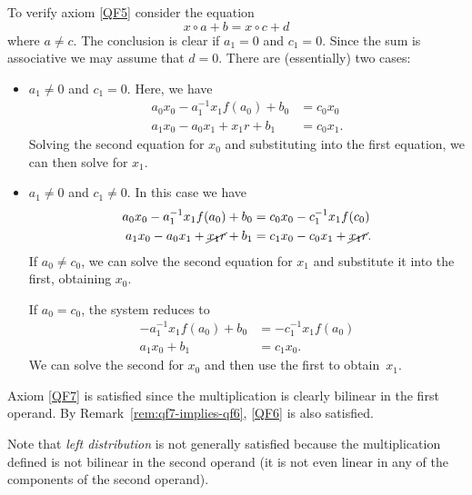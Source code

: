 \begin{xmpl}
    To verify axiom \textsc{\ref{QF5}} consider the equation
    \[
        x\circ a+ b=x\circ c+d
    \]
    where $a\ne c$. The conclusion is clear if $a_1=0$ and $c_1=0$. Since the sum is associative we may assume that $d=0$. There are (essentially) two cases:
    \begin{itemize}
        \item $a_1\ne0$ and $c_1=0$. Here, we have
        \begin{align*}
            a_0x_0-a_1^{-1}x_1f(a_0)+b_0 &= c_0x_0\\
            a_1x_0-a_0x_1+x_1r+b_1 &= c_0x_1.
        \end{align*}
        Solving the second equation for $x_0$ and substituting into the first equation, we can then solve for $x_1$.
        \item $a_1\ne0$ and $c_1\ne0$. In this case we have
        \begin{align*}
            a_0x_0-a_1^{-1}x_1f(a_0)+b_0
                &= c_0x_0-c_1^{-1}x_1f(c_0)\\
            a_1x_0-a_0x_1+\cancel{x_1r}+b_1
                &= c_1x_0-c_0x_1+\cancel{x_1r}.
        \end{align*}
        If $a_0\ne c_0$, we can solve the second equation for $x_1$ and substitute it into the first, obtaining $x_0$.

        If $a_0=c_0$, the system reduces to
        \begin{align*}
            -a_1^{-1}x_1f(a_0)+b_0 &= -c_1^{-1}x_1f(a_0)\\
            a_1x_0+b_1 &= c_1x_0.
        \end{align*}
        We can solve the second for $x_0$ and then use the first to obtain~$x_1$.
    \end{itemize}
    Axiom \textsc{\ref{QF7}} is satisfied since the multiplication is clearly bilinear in the first operand. By Remark~\ref{rem:qf7-implies-qf6}, \textsc{\ref{QF6}} is also satisfied.
    
    Note that \textit{left distribution} is not generally satisfied because the multiplication defined is not bilinear in the second operand (it is not even linear in any of the components of the second operand).


\end{xmpl}
